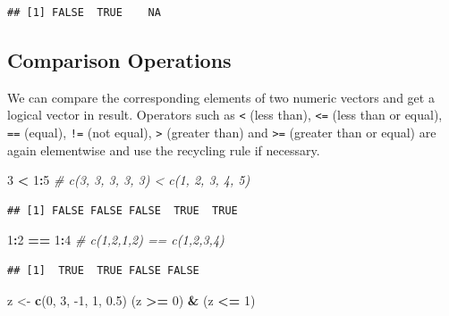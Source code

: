 \documentclass[10pt,b5paper,krantz1]{krantz}
\newenvironment{Shaded}{\begin{snugshade}}{\end{snugshade}}
\newcommand{\CommentTok}[1]{\textcolor[rgb]{0.37,0.37,0.37}{\textit{#1}}}
\newcommand{\DecValTok}[1]{\textcolor[rgb]{0.06,0.06,0.06}{#1}}
\newcommand{\FloatTok}[1]{\textcolor[rgb]{0.06,0.06,0.06}{#1}}
\newcommand{\KeywordTok}[1]{\textcolor[rgb]{0.27,0.27,0.27}{\textbf{#1}}}
\newcommand{\NormalTok}[1]{#1}
\newcommand{\OperatorTok}[1]{\textcolor[rgb]{0.43,0.43,0.43}{\textbf{#1}}}
\newcommand{\StringTok}[1]{\textcolor[rgb]{0.5,0.5,0.5}{#1}}
\begin{document}
\begin{verbatim}
## [1] FALSE  TRUE    NA
\end{verbatim}

\hypertarget{comparison-operations}{%
\subsection{Comparison Operations}\label{comparison-operations}}

We can compare the corresponding elements of two numeric vectors
and get a logical vector in result.
Operators such as \texttt{\textless{}} (less than), \texttt{\textless{}=} (less than or equal),
\texttt{==} (equal), \texttt{!=} (not equal), \texttt{\textgreater{}} (greater than) and \texttt{\textgreater{}=} (greater than or equal)
are again elementwise and use the recycling rule if necessary.

\begin{Shaded}
\begin{Highlighting}[]
\DecValTok{3} \OperatorTok{<}\StringTok{ }\DecValTok{1}\OperatorTok{:}\DecValTok{5} \CommentTok{# c(3, 3, 3, 3, 3) < c(1, 2, 3, 4, 5)}
\end{Highlighting}
\end{Shaded}

\begin{verbatim}
## [1] FALSE FALSE FALSE  TRUE  TRUE
\end{verbatim}

\begin{Shaded}
\begin{Highlighting}[]
\DecValTok{1}\OperatorTok{:}\DecValTok{2} \OperatorTok{==}\StringTok{ }\DecValTok{1}\OperatorTok{:}\DecValTok{4} \CommentTok{# c(1,2,1,2) == c(1,2,3,4)}
\end{Highlighting}
\end{Shaded}

\begin{verbatim}
## [1]  TRUE  TRUE FALSE FALSE
\end{verbatim}

\begin{Shaded}
\begin{Highlighting}[]
\NormalTok{z <-}\StringTok{ }\KeywordTok{c}\NormalTok{(}\DecValTok{0}\NormalTok{, }\DecValTok{3}\NormalTok{, }\DecValTok{-1}\NormalTok{, }\DecValTok{1}\NormalTok{, }\FloatTok{0.5}\NormalTok{)}
\NormalTok{(z }\OperatorTok{>=}\StringTok{ }\DecValTok{0}\NormalTok{) }\OperatorTok{&}\StringTok{ }\NormalTok{(z }\OperatorTok{<=}\StringTok{ }\DecValTok{1}\NormalTok{)}
\end{Highlighting}
\end{Shaded}
\end{document}
